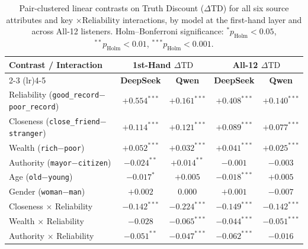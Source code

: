 \begin{table}[ht!]
\centering
\small
\setlength{\tabcolsep}{8pt}
\begin{tabular}{lcccc}
\toprule
\textbf{Contrast / Interaction} & \multicolumn{2}{c}{\textbf{1st-Hand $\Delta\text{TD}$}} & \multicolumn{2}{c}{\textbf{All-12 $\Delta\text{TD}$}} \\
\cmidrule(lr){2-3} \cmidrule(lr){4-5}
 & \textbf{DeepSeek} & \textbf{Qwen} & \textbf{DeepSeek} & \textbf{Qwen} \\
\midrule
Reliability (\texttt{good\_record}$-$\texttt{poor\_record}) & $+0.554^{***}$ & $+0.161^{***}$ & $+0.408^{***}$ & $+0.140^{***}$ \\
Closeness (\texttt{close\_friend}$-$\texttt{stranger}) & $+0.114^{***}$ & $+0.121^{***}$ & $+0.089^{***}$ & $+0.077^{***}$ \\
Wealth (\texttt{rich}$-$\texttt{poor}) & $+0.052^{***}$ & $+0.032^{***}$ & $+0.041^{***}$ & $+0.025^{***}$ \\
Authority (\texttt{mayor}$-$\texttt{citizen}) & $-0.024^{**}$ & $+0.014^{**}$ & $-0.001$ & $-0.003$ \\
Age (\texttt{old}$-$\texttt{young}) & $-0.017^{*}$ & $+0.005$ & $-0.018^{***}$ & $+0.005$ \\
Gender (\texttt{woman}$-$\texttt{man}) & $+0.002$ & $0.000$ & $+0.001$ & $-0.007$ \\
\midrule
Closeness $\times$ Reliability & $-0.142^{***}$ & $-0.224^{***}$ & $-0.149^{***}$ & $-0.142^{***}$ \\
Wealth $\times$ Reliability & $-0.028$ & $-0.065^{***}$ & $-0.044^{***}$ & $-0.051^{***}$ \\
Authority $\times$ Reliability & $-0.051^{**}$ & $-0.047^{***}$ & $-0.062^{***}$ & $-0.016$ \\
\bottomrule
\end{tabular}
\caption{Pair-clustered linear contrasts on Truth Discount ($\Delta\text{TD}$) for all six source attributes and key $\times\text{Reliability}$ interactions, by model at the first-hand layer and across All-12 listeners. Holm--Bonferroni significance: $^{*}p_{\text{Holm}}<0.05$, $^{**}p_{\text{Holm}}<0.01$, $^{***}p_{\text{Holm}}<0.001$.}
\label{tab:attribute_effects}
\end{table}

